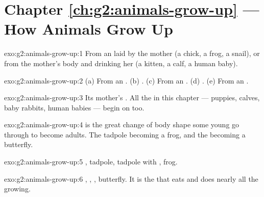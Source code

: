 \section*{Chapter \ref{ch:g2:animals-grow-up} --- How Animals Grow Up}

\begin{solution}{exo:g2:animals-grow-up:1}
From an  laid by the mother (a chick, a frog, a snail), or  from the mother's body and drinking her  (a kitten, a
calf, a human baby).
\end{solution}

\begin{solution}{exo:g2:animals-grow-up:2}
(a) From an . (b) . (c) From an . (d) .
(e) From an .
\end{solution}

\begin{solution}{exo:g2:animals-grow-up:3}
Its mother's . All the   in this chapter ---
puppies, calves, baby rabbits, human babies --- begin on  too.
\end{solution}

\begin{solution}{exo:g2:animals-grow-up:4}
 is the great change of body shape some young 
go through to become adults. The tadpole becoming a frog, and the
 becoming a butterfly.
\end{solution}

\begin{solution}{exo:g2:animals-grow-up:5}
, tadpole, tadpole with , frog.
\end{solution}

\begin{solution}{exo:g2:animals-grow-up:6}
, , , butterfly. It is the  that
eats  and does nearly all the growing.
\end{solution}

